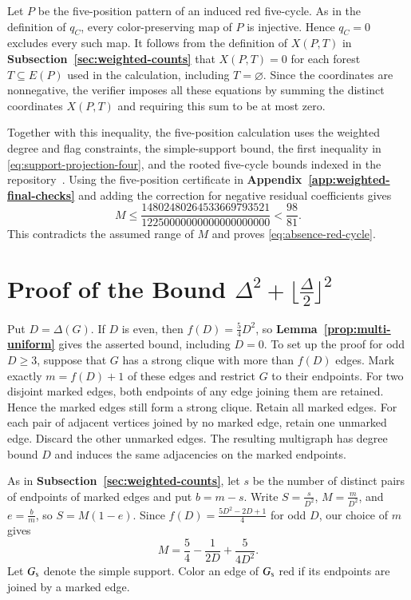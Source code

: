 \documentclass[preprint,11pt,numbers]{elsarticle-arxiv}
\numberwithin{equation}{section}
\theoremstyle{definition}
\begin{document}
Let $P$ be the five-position pattern of an induced red five-cycle.
As in the definition of $q_C$, every color-preserving map of $P$ is injective. Hence $q_C=0$ excludes every such map. It follows from
the definition of $X(P,T)$ in
\textbf{Subsection~\ref{sec:weighted-counts}} that $X(P,T)=0$ for
each forest $T\subseteq E(P)$ used in the calculation, including
$T=\varnothing$. Since the coordinates are nonnegative, the verifier
imposes all these equations by summing the distinct coordinates
$X(P,T)$ and requiring this sum to be at most zero.

Together with this inequality, the five-position calculation uses
the weighted degree and flag constraints, the simple-support bound,
the first inequality in \eqref{eq:support-projection-four}, and the
rooted five-cycle bounds indexed in the repository~\cite{FGSTCode}.
Using the five-position certificate in
\textbf{Appendix~\ref{app:weighted-final-checks}} and adding the correction for
negative residual coefficients gives
\[
 M\leq\frac{14802480264533669793521}{12250000000000000000000}
   <\frac{98}{81}.
\]
This contradicts the assumed range of $M$ and proves
\eqref{eq:absence-red-cycle}.
\section{Proof of the Bound \texorpdfstring{$\Delta^2+\lfloor\frac{\Delta}{2}\rfloor^2$}{Delta squared plus floor(Delta/2) squared}}\label{sec:exact}\label{sec:multi-odd}

Put $D=\Delta(G)$. If $D$ is even, then $f(D)=\frac{5}{4}D^2$, so
\textbf{Lemma~\ref{prop:multi-uniform}} gives the asserted bound,
including $D=0$. To set up the proof for odd $D\geq3$, suppose that
$G$ has a strong clique with more than $f(D)$ edges. Mark
exactly $m=f(D)+1$ of these edges and restrict $G$ to their endpoints.
For two disjoint marked edges, both endpoints of any edge joining them
are retained. Hence the marked edges still form a strong clique.
Retain all marked edges. For each pair of adjacent vertices joined by
no marked edge, retain one unmarked edge. Discard the other unmarked
edges. The resulting multigraph has degree bound $D$ and induces the
same adjacencies on the marked endpoints.

As in \textbf{Subsection~\ref{sec:weighted-counts}}, let $s$ be the
number of distinct pairs of endpoints of marked edges and put $b=m-s$. Write
$S=\frac{s}{D^2}$, $M=\frac{m}{D^2}$, and $e=\frac{b}{m}$, so
$S=M(1-e)$. Since $f(D)=\frac{5D^2-2D+1}{4}$ for odd $D$, our
choice of $m$ gives
\begin{equation}\label{eq:multi-mass}
 M=\frac{5}{4}-\frac{1}{2D}+\frac{5}{4D^2}.
\end{equation}
Let $G_{\rm s}$ denote the simple support. Color an edge of $G_{\rm s}$
red if its endpoints are joined by a marked edge.
\end{document}

